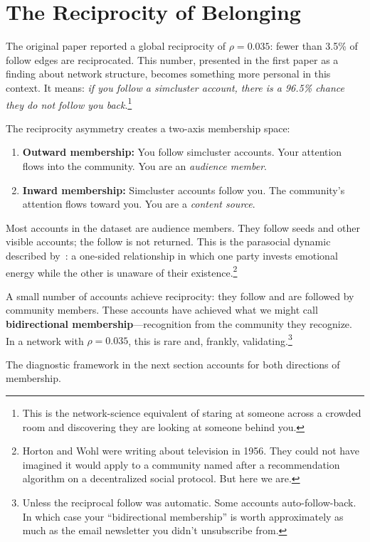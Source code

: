 \documentclass[11pt,a4paper]{article}
\begin{document}
\section{The Reciprocity of Belonging}
\label{sec:reciprocity}

The original paper reported a global reciprocity of $\rho = 0.035$: fewer than 3.5\% of follow edges are reciprocated. This number, presented in the first paper as a finding about network structure, becomes something more personal in this context. It means: \textit{if you follow a simcluster account, there is a 96.5\% chance they do not follow you back}.\footnote{This is the network-science equivalent of staring at someone across a crowded room and discovering they are looking at someone behind you.}

The reciprocity asymmetry creates a two-axis membership space:

\begin{enumerate}[leftmargin=*]
    \item \textbf{Outward membership:} You follow simcluster accounts. Your attention flows into the community. You are an \textit{audience member}.
    \item \textbf{Inward membership:} Simcluster accounts follow you. The community's attention flows toward you. You are a \textit{content source}.
\end{enumerate}

Most accounts in the dataset are audience members. They follow seeds and other visible accounts; the follow is not returned. This is the parasocial dynamic described by~\cite{horton1956}: a one-sided relationship in which one party invests emotional energy while the other is unaware of their existence.\footnote{Horton and Wohl were writing about television in 1956. They could not have imagined it would apply to a community named after a recommendation algorithm on a decentralized social protocol. But here we are.}

A small number of accounts achieve reciprocity: they follow and are followed by community members. These accounts have achieved what we might call \textbf{bidirectional membership}---recognition from the community they recognize. In a network with $\rho = 0.035$, this is rare and, frankly, validating.\footnote{Unless the reciprocal follow was automatic. Some accounts auto-follow-back. In which case your ``bidirectional membership'' is worth approximately as much as the email newsletter you didn't unsubscribe from.}

The diagnostic framework in the next section accounts for both directions of membership.
\end{document}
